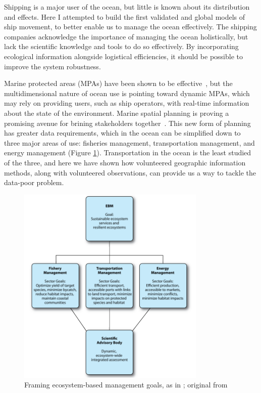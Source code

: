 
Shipping is a major user of the ocean, but little is known about its distribution and effects. Here I attempted to build the first validated and global models of ship movement, to better enable us to manage the ocean effectively. The shipping companies acknowledge the importance of managing the ocean holistically, but lack the scientific knowledge and tools to do so effectively. By incorporating ecological information alongside logistical efficiencies, it should be possible to improve the system robustness.

Marine protected areas (MPAs) have been shown to be effective~\citep{halpern2002marine}, but the multidimensional nature of ocean use is pointing toward dynamic MPAs, which may rely on providing users, such as ship operators, with real-time information about the state of the environment. Marine spatial planning is proving a promising avenue for brining stakeholders together~\citep{merrifield2012marinemap}. This new form of planning has greater data requirements, which in the ocean can be simplified down to three major areas of use: fisheries management, transportation management, and energy management (Figure \ref{fig:framing}). Transportation in the ocean is the least studied of the three, and here we have shown how volunteered geographic information methods, along with volunteered observations, can provide us a way to tackle the data-poor problem.

\begin{figure}[h!]
  \centering
    \includegraphics[width=90mm]{images/lubechenco-diagram.png}
  \caption {Framing ecosystem-based management goals, as in \cite{Lubchenco2010}; original from \citep{McLeod2009}}
  \label{fig:framing}
\end{figure}


